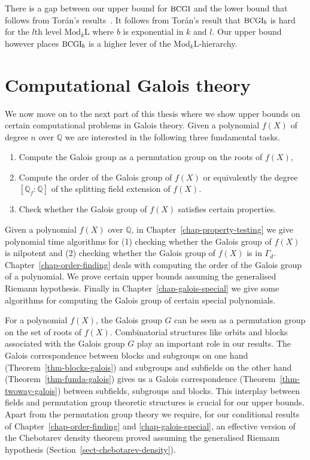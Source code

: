 \documentclass[11pt]{madras}%
\theoremstyle{remark}
\newcommand{\ModkL}[1]{{\ensuremath{\mathrm{Mod}_{#1}\mathrm{L}}}}
\newcommand{\ProblemFont}[1]{{\ensuremath{\textrm{\small #1}}}}
\begin{document}
There is a gap between our upper bound for $\ProblemFont{BCGI}$ and
the lower bound that follows from Tor\'an's
results~\cite{toran2004hardness}. It follows from Tor\'an's result
that $\ProblemFont{BCGI}_b$ is hard for the $l$th level $\ModkL{k}$
where $b$ is exponential in $k$ and $l$. Our upper bound however places
$\ProblemFont{BCGI}_b$ is a higher lever of the $\ModkL{k}$-hierarchy.
\chapter{Computational Galois theory}
\label{chap-ant}

We now move on to the next part of this thesis where we show upper
bounds on certain computational problems in Galois theory. Given a
polynomial $f(X)$ of degree $n$ over $\mathbb{Q}$ we are interested in
the following three fundamental tasks.

\begin{enumerate}
\item Compute the Galois group as a permutation group on the roots of
  $f(X)$,
\item Compute the order of the Galois group of $f(X)$ or equivalently
  the degree $[\mathbb{Q}_f: \mathbb{Q}]$ of the splitting field
  extension of $f(X)$.
\item Check whether the Galois group of $f(X)$ satisfies certain
  properties.
\end{enumerate}

Given a polynomial $f(X)$ over $\mathbb{Q}$, in
Chapter~\ref{chap-property-testing} we give polynomial time algorithms
for (1) checking whether the Galois group of $f(X)$ is nilpotent and
(2) checking whether the Galois group of $f(X)$ is in $\Gamma_d$.
Chapter~\ref{chap-order-finding} deals with computing the order of the
Galois group of a polynomial. We prove certain upper bounds assuming
the generalised Riemann hypothesis. Finally in
Chapter~\ref{chap-galois-special} we give some algorithms for
computing the Galois group of certain special polynomials.

For a polynomial $f(X)$, the Galois group $G$ can be seen as a
permutation group on the set of roots of $f(X)$.  Combinatorial
structures like orbits and blocks associated with the Galois group $G$
play an important role in our results. The Galois correspondence
between blocks and subgroups on one hand
(Theorem~\ref{thm-blocks-galois}) and subgroups and subfields on the
other hand (Theorem~\ref{thm-funda-galois}) gives us a Galois
correspondence (Theorem~\ref{thm-twoway-galois}) between subfields,
subgroups and blocks. This interplay between fields and permutation
group theoretic structures is crucial for our upper bounds.  Apart
from the permutation group theory we require, for our conditional
results of Chapter~\ref{chap-order-finding} and
\ref{chap-galois-special}, an effective version of the Chebotarev
density theorem proved assuming the generalised Riemann hypothesis
(Section~\ref{sect-chebotarev-density}).
\end{document}
